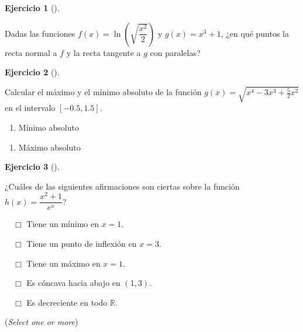 \documentclass[
  a4paper,
]{scrreport}
\providecommand{\tightlist}{%
  \setlength{\itemsep}{0pt}\setlength{\parskip}{0pt}}\usepackage{longtable,booktabs,array}
\theoremstyle{definition}
\newtheorem{exercise}{Ejercicio}[chapter]
\theoremstyle{remark}
\begin{document}
\leavevmode{}%
\begin{exercise}[]\label{exr-pendientes-tangentes}

Dadas las funciones \(f(x)=\ln\left(\sqrt{\dfrac{x^2}{2}}\right)\) y
\(g(x)=x^3+1\), ¿en qué puntos la recta normal a \(f\) y la recta
tangente a \(g\) con paralelas?

\vspace{18pt}

\end{exercise}

\leavevmode{}%
\begin{exercise}[]\label{exr-extremos-absolutos}

Calcular el máximo y el mínimo absoluto de la función
\(g(x)=\sqrt{x^4-3x^3+\frac{5}{2}x^2}\) en el intervalo \([-0.5,1.5]\).

\begin{enumerate}
\def\labelenumi{\alph{enumi}.}
\tightlist
\item
  Mínimo absoluto
\end{enumerate}

\vspace{18pt}

\begin{enumerate}
\def\labelenumi{\alph{enumi}.}
\setcounter{enumi}{1}
\tightlist
\item
  Máximo absoluto
\end{enumerate}

\vspace{18pt}

\end{exercise}

\leavevmode{}%
\begin{exercise}[]\label{exr-extremos-puntos-inflexion}

¿Cuáles de las siguientes afirmaciones son ciertas sobre la función
\(h(x)=\dfrac{x^2+1}{e^x}\)?

${\quad\Box}$ Tiene un mínimo en $x=1$.

${\quad\Box}$ Tiene un punto de inflexión en $x=3$.

${\quad\Box}$ Tiene un máximo en $x=1$.

${\quad\Box}$ Es cóncava hacia abajo en $(1,3)$.

${\quad\Box}$ Es decreciente en todo $\mathbb{R}$.

(\emph{Select one or more})

\end{exercise}
\end{document}

